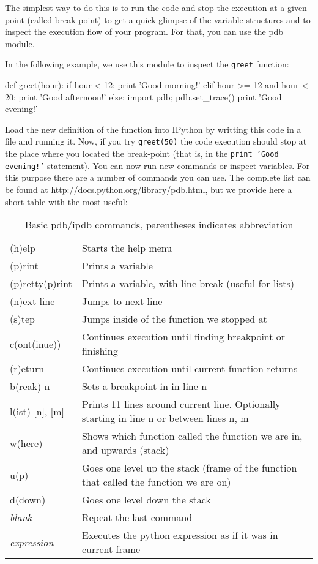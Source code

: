 The simplest way to do this is to run the code and stop the execution at a given point (called break-point) to get a quick glimpse of the variable structures and to inspect the execution flow of your program. For that, you can use the pdb module. 

In the following example, we use this module to inspect the \texttt{greet} function:

\begin{python}
def greet(hour):
    if hour < 12:
        print 'Good morning!'
    elif hour >= 12 and hour < 20:
        print 'Good afternoon!'
    else:
        import pdb; pdb.set_trace()
        print 'Good evening!'
\end{python}

Load the new definition of the function into IPython by writting this code in a file and running it. Now, if you try \texttt{greet(50)} the code execution should stop at the place where you located the break-point (that is, in the \texttt{print 'Good evening!'} statement). You can now run new commands or inspect variables. For this purpose there are a number of commands you can use. The complete list can be found at \url{http://docs.python.org/library/pdb.html}, but we provide here a short table with the most useful: 

\begin{table}[!h]
\begin{center}
\begin{tabular}{|l|l|}
\hline
(h)elp           & Starts the help menu\\
(p)rint          & Prints a variable\\
(p)retty(p)rint	 & Prints a variable, with line break (useful for lists)\\
\hline
(n)ext line      & Jumps to next line\\ 
(s)tep           & Jumps inside of the function we stopped at\\
c(ont(inue))     & Continues execution until finding breakpoint or finishing\\
(r)eturn         & Continues execution until current function returns\\
b(reak) n        & Sets a breakpoint in in line n\\
\hline
l(ist) [n], [m]  & Prints 11 lines around current line. Optionally starting in line n or between lines n, m\\
w(here)          & Shows which function called the function we are in, and upwards (stack\footnotemark)\\
u(p)             & Goes one level up the stack (frame of the function that called the function we are on)\\
d(down)          & Goes one level down the stack\\
\hline
\textit{blank}          & Repeat the last command\\ 
\textit{expression}     & Executes the python expression as if it was in current frame\\
\hline
\end{tabular}
\end{center}
\caption{\label{tb::pdbbasiccommands}Basic pdb/ipdb commands, parentheses indicates abbreviation}
\end{table}

